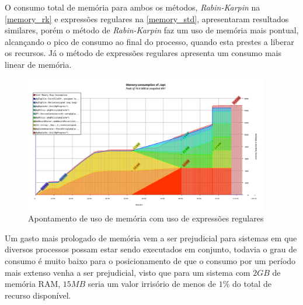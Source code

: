 O consumo total de memória para ambos os métodos, \textit{Rabin-Karpin} na \autoref{memory_rk} e expressões regulares na \autoref{memory_std},  apresentaram resultados similares, porém o método de \textit{Rabin-Karpin} faz um uso de memória mais pontual, alcançando o pico de consumo ao final do processo, quando esta prestes a liberar os recursos. Já o método de expressões regulares apresenta um consumo mais linear de memória. 


\begin{figure}[htbp]
  \centering
  \includegraphics[width=0.95\textwidth]{figuras/memory_regex.png}
  \caption{Apontamento de uso de memória com uso de expressões regulares}
  \label{memory_std}
\end{figure}

Um gasto mais prologado de memória vem a ser prejudicial para sistemas em que diversos processos possam estar sendo executados em conjunto, todavia o grau de consumo é muito baixo para o posicionamento de que o consumo por um período mais extenso venha a ser prejudicial, visto que para um sistema com $2GB$ de memória RAM, $15MB$ seria um valor irrisório de menos de $1\%$ do total de recurso disponível.

